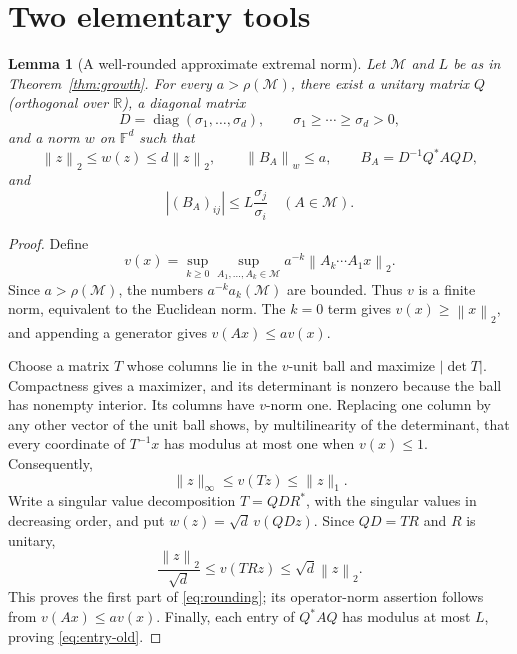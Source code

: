 \documentclass[11pt]{article}
\newtheorem{lemma}[theorem]{Lemma}
\theoremstyle{remark}\newtheorem{remark}[theorem]{Remark}
\newcommand{\F}{\mathbb F}
\newcommand{\R}{\mathbb R}
\newcommand{\norm}[1]{\left\lVert #1\right\rVert_2}
\newcommand{\opnorm}[2]{\left\lVert #1\right\rVert_{#2}}
\newcommand{\diag}{\operatorname{diag}}
\begin{document}
\section{Two elementary tools}
\begin{lemma}[A well-rounded approximate extremal norm]\label{lem:rounded}
Let $\mathcal M$ and $L$ be as in Theorem~\ref{thm:growth}. For every $a>\rho(\mathcal M)$, there exist a unitary matrix $Q$ (orthogonal over $\R$), a diagonal matrix
\[
 D=\diag(\sigma_1,\ldots,\sigma_d),\qquad
 \sigma_1\geq\cdots\geq\sigma_d>0,
\]
and a norm $w$ on $\F^d$ such that
\begin{equation}\label{eq:rounding}
 \norm z\leq w(z)\leq d\norm z,
 \qquad \opnorm{B_A}{w}\leq a,
 \qquad B_A=D^{-1}Q^*AQD,
\end{equation}
and
\begin{equation}\label{eq:entry-old}
 |(B_A)_{ij}|\leq L\frac{\sigma_j}{\sigma_i}
 \quad(A\in\mathcal M).
\end{equation}
\end{lemma}
\begin{proof}
Define
\[
 v(x)=\sup_{k\geq0}\sup_{A_1,\ldots,A_k\in\mathcal M}
               a^{-k}\norm{A_k\cdots A_1x}.
\]
Since $a>\rho(\mathcal M)$, the numbers $a^{-k}a_k(\mathcal M)$ are bounded. Thus $v$ is a finite norm, equivalent to the Euclidean norm. The $k=0$ term gives $v(x)\geq\norm x$, and appending a generator gives $v(Ax)\leq av(x)$.

Choose a matrix $T$ whose columns lie in the $v$-unit ball and maximize $|\det T|$. Compactness gives a maximizer, and its determinant is nonzero because the ball has nonempty interior. Its columns have $v$-norm one. Replacing one column by any other vector of the unit ball shows, by multilinearity of the determinant, that every coordinate of $T^{-1}x$ has modulus at most one when $v(x)\leq1$. Consequently,
\[
 \lVert z\rVert_\infty\leq v(Tz)\leq\lVert z\rVert_1.
\]
Write a singular value decomposition $T=QDR^*$, with the singular values in decreasing order, and put $w(z)=\sqrt d\,v(QDz)$. Since $QD=TR$ and $R$ is unitary,
\[
 \frac{\norm z}{\sqrt d}\leq v(TRz)\leq\sqrt d\norm z.
\]
This proves the first part of \eqref{eq:rounding}; its operator-norm assertion follows from $v(Ax)\leq av(x)$. Finally, each entry of $Q^*AQ$ has modulus at most $L$, proving \eqref{eq:entry-old}.
\end{proof}
\end{document}
